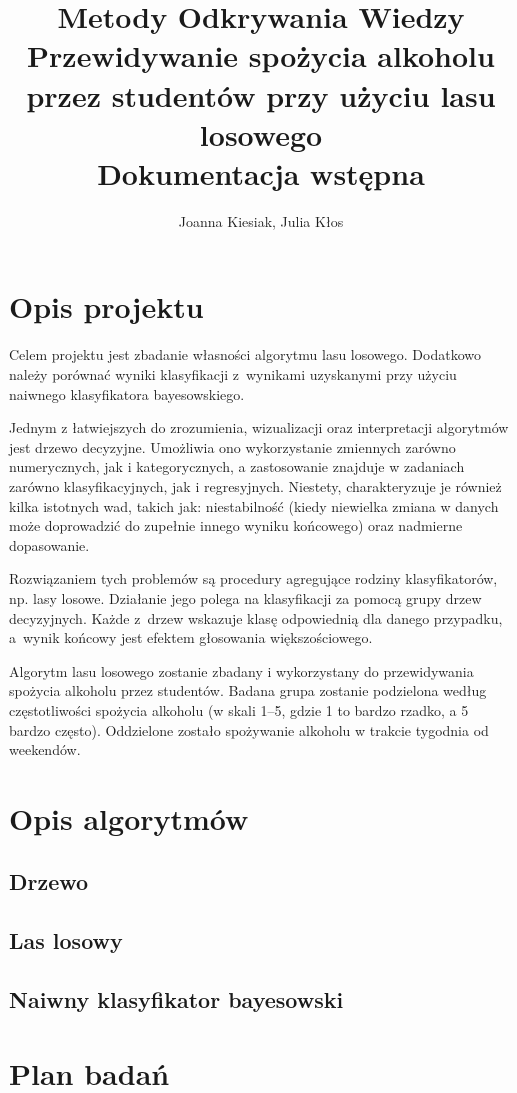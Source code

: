 \documentclass{article}
\title{{\normalfont Metody Odkrywania Wiedzy}\vspace{0.2cm} \\ 
Przewidywanie spożycia alkoholu przez studentów przy użyciu lasu losowego\\
\vspace{0.2cm}
\large{\normalfont Dokumentacja wstępna}}
\author{
Joanna Kiesiak, Julia Kłos\\

}
\begin{document}
\maketitle

\section{Opis projektu}
Celem projektu jest zbadanie własności algorytmu lasu losowego. Dodatkowo należy porównać wyniki klasyfikacji z~wynikami uzyskanymi przy użyciu naiwnego klasyfikatora bayesowskiego.

Jednym z łatwiejszych do zrozumienia, wizualizacji oraz interpretacji algorytmów jest drzewo decyzyjne. Umożliwia ono wykorzystanie zmiennych zarówno numerycznych, jak i
kategorycznych, a zastosowanie znajduje w zadaniach zarówno klasyfikacyjnych, jak i regresyjnych. Niestety, charakteryzuje je również kilka istotnych wad, takich jak: niestabilność (kiedy niewielka zmiana w danych może doprowadzić do zupełnie innego wyniku
końcowego) oraz nadmierne dopasowanie.

Rozwiązaniem tych problemów są procedury agregujące rodziny klasyfikatorów, np. lasy losowe.
Działanie jego polega na klasyfikacji za pomocą grupy drzew decyzyjnych. Każde z~drzew wskazuje
klasę odpowiednią dla danego przypadku, a~wynik końcowy jest efektem głosowania większościowego.

Algorytm lasu losowego zostanie zbadany i wykorzystany do przewidywania spożycia alkoholu przez studentów. Badana grupa zostanie podzielona według częstotliwości spożycia alkoholu (w skali 1--5, gdzie 1 to bardzo rzadko, a 5 bardzo często). Oddzielone zostało spożywanie alkoholu w trakcie tygodnia od weekendów.
\section{Opis algorytmów}
\subsection{Drzewo}
\subsection{Las losowy}
\subsection{Naiwny klasyfikator bayesowski}

\section{Plan badań}
\end{document}
